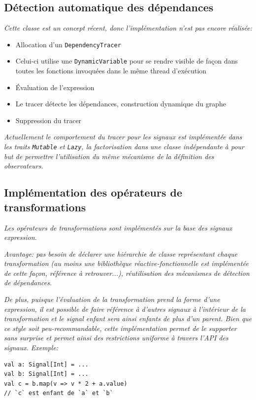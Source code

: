 \subsection{Détection automatique des dépendances}
\textit{Cette classe est un concept récent, donc l'implémentation n'est pas encore réalisée:}
{\itshape \begin{itemize}
	\item Allocation d'un \texttt{DependencyTracer}
	\item Celui-ci utilise une \texttt{DynamicVariable} pour se rendre visible de façon dans toutes les fonctions invoquées dans le même thread d'exécution
	\item Évaluation de l'expression
	\item Le tracer détecte les dépendances, construction dynamique du graphe
	\item Suppression du tracer
\end{itemize}}
\textit{Actuellement le comportement du tracer pour les signaux est implémentée dans les traits \texttt{Mutable} et \texttt{Lazy}, la factorisation dans une classe indépendante à pour but de permettre l'utilisation du même mécanisme de la définition des observateurs.}

\subsection{Implémentation des opérateurs de transformations}
\textit{Les opérateurs de transformations sont implémentés sur la base des signaux expression.}

\textit{Avantage: pas besoin de déclarer une hiérarchie de classe représentant chaque transformation (au moins une bibliothèque réactive-fonctionnelle est implémentée de cette façon, référence à retrouver...), réutilisation des mécanismes de détection de dépendances.}

\textit{De plus, puisque l'évaluation de la transformation prend la forme d'une expression, il est possible de faire référence à d'autres signaux à l'intérieur de la transformation et le signal enfant sera ainsi enfants de plus d'un parent. Bien que ce style soit peu-recommandable, cette implémentation permet de le supporter sans surprise et permet ainsi des restrictions uniforme à travers l'API des signaux. Exemple:}
\begin{lstlisting}
val a: Signal[Int] = ...
val b: Signal[Int] = ...
val c = b.map(v => v * 2 + a.value)
// `c` est enfant de `a` et `b`
\end{lstlisting}

